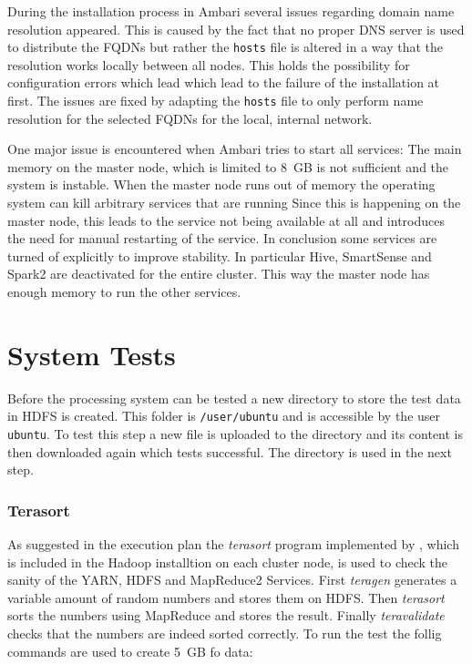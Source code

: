 During the installation process in Ambari several issues regarding domain name resolution appeared.
This is caused by the fact that no proper \ac{DNS} server is used to distribute the \acp{FQDN} 
but rather the \texttt{hosts} file is altered in a way that the resolution works locally between all nodes. 
This holds the possibility for configuration errors which lead which lead to the failure of the installation at first.
The issues are fixed by adapting the \texttt{hosts} file to only perform name resolution for the selected \acp{FQDN} for the local, internal network. 

One major issue is encountered when Ambari tries to start all services: The main memory on the master node, which is limited to 8~\ac{GB} is not sufficient and the system is instable.
When the master node runs out of memory the operating system can kill arbitrary services that are running
Since this is happening on the master node, this leads to the service not being available at all and introduces the need for manual restarting of the service.
In conclusion some services are turned of explicitly to improve stability. 
In particular Hive, SmartSense and Spark2 are deactivated for the entire cluster. 
This way the master node has enough memory to run the other services.

\section{System Tests}

Before the processing system can be tested a new directory to store the test data in \ac{HDFS}
is created. 
This folder is \texttt{/user/ubuntu} and is accessible by the user \texttt{ubuntu}.
To test this step a new file is uploaded to the directory and its content is then downloaded again which tests successful. The directory is used in the next step.

\subsubsection{Terasort}

As suggested in the execution plan the \emph{terasort} program implemented by \textcite{omally2008terasort}, which is included in the Hadoop installtion on each cluster node, is used to check the sanity of the \ac{YARN}, \ac{HDFS} and MapReduce2 Services.
First \emph{teragen} generates a variable amount of random numbers and stores them on \ac{HDFS}. Then \emph{terasort} sorts the numbers using MapReduce and stores the result.
Finally \emph{teravalidate} checks that the numbers are indeed sorted correctly.
To run the test the follig commands are used to create 5~\ac{GB} fo data:\\

